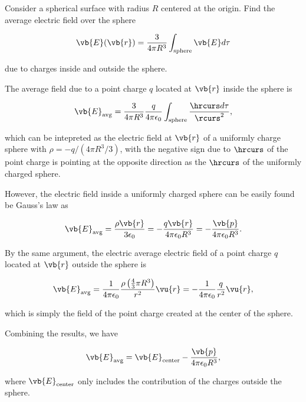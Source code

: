 \documentclass[english,a4paper,12pt]{report}
\begin{document}
{Consider a spherical surface with radius \(R\) centered at the origin. Find the average electric field over the sphere 

\begin{equation}
    \vb{E} (\vb{r} ) = \frac{3}{4\pi R^3}\int_{\text{sphere} }^{} \vb{E} d\tau  
\end{equation}

due to charges inside and outside the sphere.
}
{The average field due to a point charge \(q\) located at \(\vb{r} \)  inside the sphere is 

\begin{equation}
    \vb{E} _{\text{avg} } = \frac{3}{4\pi R^3 } \frac{q}{4\pi \epsilon_0} \int_{\text{sphere} }^{} \frac{\hrcurs d\tau }{\rcurs ^2},  
\end{equation}

which can be intepreted as the electric field at \(\vb{r} \) of a uniformly charge sphere with \(\rho = -q / (4\pi R^3 /3) \), with the negative sign due to \(\hrcurs \) of the point charge is pointing at the opposite direction as the \(\hrcurs \) of the uniformly charged sphere. 

However, the electric field inside a uniformly charged sphere can be easily found be Gauss's law as 

\begin{equation}
    \vb{E} _{\text{avg} } = \frac{\rho \vb{r} }{3 \epsilon_0 } = -\frac{q\vb{r}  }{4\pi \epsilon_0 R^3 } = - \frac{\vb{p} }{4\pi \epsilon_0 R^3 }.
\end{equation}

By the same argument, the electric average electric field of a point charge \(q\) located at \(\vb{r} \) outside the sphere is 

\begin{equation}
    \vb{E} _{\text{avg} } = \frac{1}{4\pi \epsilon_0} \frac{\rho \left( \frac{4}{3}\pi R^3   \right)}{r^2}\vu{r}  = - \frac{1}{4\pi \epsilon_0} \frac{q}{r^2}\vu{r} ,   
\end{equation}

which is simply the field of the point charge created at the center of the sphere. 

Combining the results, we have

\begin{equation}
    \vb{E} _{\text{avg} } = \vb{E} _{\text{center} } - \frac{\vb{p} }{4\pi \epsilon_0 R^3 },   
\end{equation}

where \(\vb{E} _{\text{center} } \) only includes the contribution of the charges outside the sphere. 

} 
\end{document}
